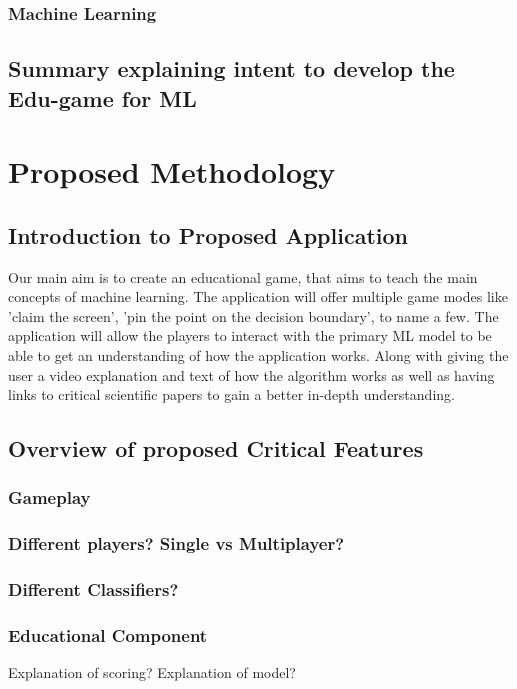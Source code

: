 \documentclass[a4paper,10pt]{article}
\begin{document}
\subsubsection{Machine Learning}


\subsection{Summary explaining intent to develop the Edu-game for ML}


\section{Proposed Methodology}
\subsection{Introduction to Proposed Application}
Our main aim is to create an educational game, that aims to teach the main concepts of machine learning. The application will offer multiple game modes like 'claim the screen', 'pin the point on the decision boundary', to name a few. The application will allow the players to interact with the primary ML model to be able to get an understanding of how the application works. Along with giving the user a video explanation and text of how the algorithm works as well as having links to critical scientific papers to gain a better in-depth understanding.  

\subsection{Overview of proposed Critical Features}
\subsubsection{Gameplay}


\subsubsection{Different players? Single vs Multiplayer?}
\subsubsection{Different Classifiers?}
\subsubsection{Educational Component}
Explanation of scoring?
Explanation of model?
\end{document}
